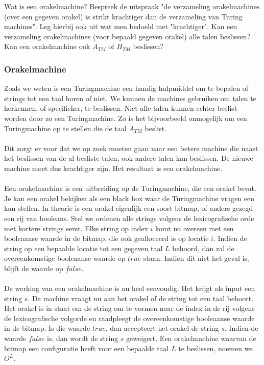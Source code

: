 \begin{question}
	Wat is een orakelmachine? Bespreek de uitspraak "de verzameling orakelmachines (over een gegeven orakel) is strikt krachtiger dan de verzameling van Turing machines". Leg hierbij ook uit wat men bedoeld met "krachtiger". Kan een verzameling orakelmachines (voor bepaald gegeven orakel) alle talen beslissen? Kan een orakelmachine ook $A_{TM}$ of $H_{TM}$ beslissen?
\end{question}

\subsubsection*{Orakelmachine}

Zoals we weten is een Turingmachine een handig hulpmiddel om te bepalen of strings tot een taal horen of niet. We kunnen de machines gebruiken om talen te herkennen, of specifieker, te beslissen. Niet alle talen kunnen echter beslist worden door zo een Turingmachine. Zo is het bijvoorbeeld onmogelijk om een Turingmachine op te stellen die de taal $A_{TM}$ beslist.
\\\\
Dit zorgt er voor dat we op zoek moeten gaan naar een betere machine die naast het beslissen van de al besliste talen, ook andere talen kan beslissen. De nieuwe machine moet dus krachtiger zijn. Het resultaat is een orakelmachine.
\\\\
Een orakelmachine is een uitbreiding op de Turingmachine, die een orakel bevat. Je kan een orakel bekijken als een black box waar de Turingmachine vragen een kan stellen. In theorie is een orakel eigenlijk een soort bitmap, of anders gezegd een rij van booleans. Stel we ordenen alle strings volgens de lexicografische orde met kortere strings eerst. Elke string op index $i$ komt nu overeen met een booleaanse waarde in de bitmap, die ook gealloceerd is op locatie $i$. Indien de string op een bepaalde locatie tot een gegeven taal $L$ behoord, dan zal de overeenkomstige booleaanse waarde op $true$ staan. Indien dit niet het geval is, blijft de waarde op $false$.
\\\\
De werking van een orakelmachine is nu heel eenvoudig. Het krijgt als input een string $s$. De machine vraagt nu aan het orakel of de string tot een taal behoort. Het orakel is in staat om de string om te vormen naar de index in de rij volgens de lexicografische volgorde en raadpleegt de overeenkomstige booleaanse waarde in de bitmap. Is die waarde $true$, dan accepteert het orakel de string $s$. Indien de waarde $false$ is, dan wordt de string $s$ geweigert. Een orakelmachine waarvan de bitmap een configuratie heeft voor een bepaalde taal $L$ te beslissen, noemen we $O^L$.

